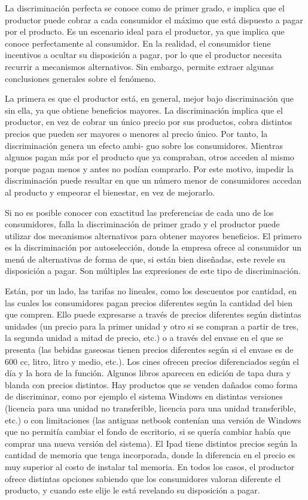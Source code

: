 \documentclass[
  12pt,
  spanish,
]{book}
\begin{document}
La discriminación perfecta se conoce como de primer grado, e implica que el productor puede cobrar a cada consumidor el máximo que está dispuesto a pagar por el producto. Es un escenario ideal para el productor, ya que implica que conoce perfectamente al consumidor. En la realidad, el consumidor tiene incentivos a ocultar su disposición a pagar, por lo que el productor necesita recurrir a mecanismos alternativos. Sin embargo, permite extraer algunas conclusiones generales sobre el fenómeno.

La primera es que el productor está, en general, mejor bajo discriminación que sin ella, ya que obtiene beneficios mayores. La discriminación implica que el productor, en vez de cobrar un único precio por sus productos, cobra distintos precios que pueden ser mayores o menores al precio único. Por tanto, la discriminación genera un efecto ambi- guo sobre los consumidores. Mientras algunos pagan más por el producto que ya compraban, otros acceden al mismo porque pagan menos y antes no podían comprarlo. Por este motivo, impedir la discriminación puede resultar en que un número menor de consumidores accedan al producto y empeorar el bienestar, en vez de mejorarlo.

Si no es posible conocer con exactitud las preferencias de cada uno de los consumidores, falla la discriminación de primer grado y el productor puede utilizar dos mecanismos alternativos para obtener mayores beneficios. El primero es la discriminación por autoselección, donde la empresa ofrece al consumidor un menú de alternativas de forma de que, si están bien diseñadas, este revele su disposición a pagar. Son múltiples las expresiones de este tipo de discriminación.

Están, por un lado, las tarifas no lineales, como los descuentos por cantidad, en las cuales los consumidores pagan precios diferentes según la cantidad del bien que compren. Ello puede expresarse a través de precios diferentes según distintas unidades (un precio para la primer unidad y otro si se compran a partir de tres, la segunda unidad a mitad de precio, etc.) o a través del envase en el que se presenta (las bebidas gaseosas tienen precios diferentes según si el envase es de 600 cc, litro, litro y medio, etc.). Los cines ofrecen precios diferenciados según el día y la hora de la función. Algunos libros aparecen en edición de tapa dura y blanda con precios distintos. Hay productos que se venden dañados como forma de discriminar, como por ejemplo el sistema Windows en distintas versiones (licencia para una unidad no transferible, licencia para una unidad transferible, etc.) o con limitaciones (las antiguas netbook contenían una versión de Windows que no permitía cambiar el fondo de escritorio, si se quería cambiar había que comprar una nueva versión del sistema). El Ipad tiene distintos precios según la cantidad de memoria que tenga incorporada, donde la diferencia en el precio es muy superior al costo de instalar tal memoria. En todos los casos, el productor ofrece distintas opciones sabiendo que los consumidores valoran diferente el producto, y cuando este elije le está revelando su disposición a pagar.
\end{document}
